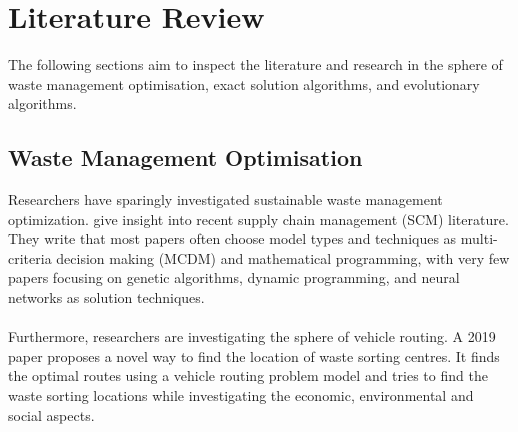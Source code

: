 \documentclass[mscthesis, 11pt]{usiinfthesis}
\theoremstyle{newdefinition}
\begin{document}
\chapter[Literature Review]{Literature Review}
The following sections aim to inspect the literature and research in the sphere of waste management optimisation, exact solution algorithms, and evolutionary algorithms.
\section{Waste Management Optimisation}\label{sec:wmo}
Researchers have sparingly investigated sustainable waste management optimization. \cite{brandenburg_quantitative_2014} give insight into recent supply chain management (SCM) literature. They write that most papers often choose model types and techniques as multi-criteria decision making (MCDM) and mathematical programming, with very few papers focusing on genetic algorithms, dynamic programming, and neural networks as solution techniques.\\
\\
Furthermore, researchers are investigating the sphere of vehicle routing. A 2019 paper proposes a novel way to find the location of waste sorting centres. It finds the optimal routes using a vehicle routing problem model and tries to find the waste sorting locations while investigating the economic, environmental and social aspects. \cite{farahbakhsh_sustainable_2019}\\
\\
\end{document}
